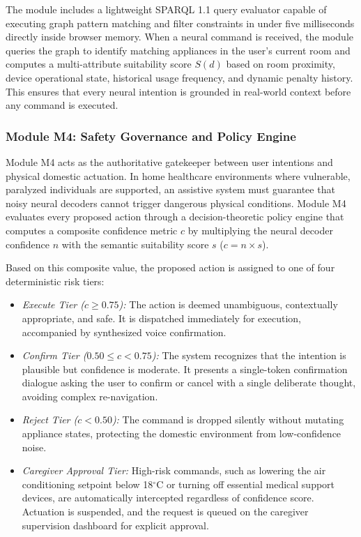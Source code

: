 \documentclass[12pt,a4paper]{report}
\begin{document}
The module includes a lightweight SPARQL 1.1 query evaluator capable of executing graph pattern matching and filter constraints in under five milliseconds directly inside browser memory. When a neural command is received, the module queries the graph to identify matching appliances in the user's current room and computes a multi-attribute suitability score $S(d)$ based on room proximity, device operational state, historical usage frequency, and dynamic penalty history. This ensures that every neural intention is grounded in real-world context before any command is executed.

\subsubsection{Module M4: Safety Governance and Policy Engine}
Module M4 acts as the authoritative gatekeeper between user intentions and physical domestic actuation. In home healthcare environments where vulnerable, paralyzed individuals are supported, an assistive system must guarantee that noisy neural decoders cannot trigger dangerous physical conditions. Module M4 evaluates every proposed action through a decision-theoretic policy engine that computes a composite confidence metric $c$ by multiplying the neural decoder confidence $n$ with the semantic suitability score $s$ ($c = n \times s$).

Based on this composite value, the proposed action is assigned to one of four deterministic risk tiers:
\begin{itemize}[leftmargin=1.5em]
    \item \textit{Execute Tier ($c \ge 0.75$):} The action is deemed unambiguous, contextually appropriate, and safe. It is dispatched immediately for execution, accompanied by synthesized voice confirmation.
    \item \textit{Confirm Tier ($0.50 \le c < 0.75$):} The system recognizes that the intention is plausible but confidence is moderate. It presents a single-token confirmation dialogue asking the user to confirm or cancel with a single deliberate thought, avoiding complex re-navigation.
    \item \textit{Reject Tier ($c < 0.50$):} The command is dropped silently without mutating appliance states, protecting the domestic environment from low-confidence noise.
    \item \textit{Caregiver Approval Tier:} High-risk commands, such as lowering the air conditioning setpoint below 18$^\circ$C or turning off essential medical support devices, are automatically intercepted regardless of confidence score. Actuation is suspended, and the request is queued on the caregiver supervision dashboard for explicit approval.
\end{itemize}
\end{document}
